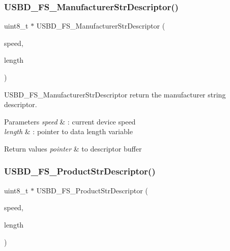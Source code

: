 \subsubsection{\texorpdfstring{U\+S\+B\+D\+\_\+\+F\+S\+\_\+\+Manufacturer\+Str\+Descriptor()}{USBD\_FS\_ManufacturerStrDescriptor()}}
{\footnotesize\ttfamily uint8\+\_\+t $\ast$ U\+S\+B\+D\+\_\+\+F\+S\+\_\+\+Manufacturer\+Str\+Descriptor (\begin{DoxyParamCaption}\item[{U\+S\+B\+D\+\_\+\+Speed\+Type\+Def}]{speed,  }\item[{uint16\+\_\+t $\ast$}]{length }\end{DoxyParamCaption})}



U\+S\+B\+D\+\_\+\+F\+S\+\_\+\+Manufacturer\+Str\+Descriptor return the manufacturer string descriptor. 


\begin{DoxyParams}{Parameters}
{\em speed} & \+: current device speed \\
\hline
{\em length} & \+: pointer to data length variable \\
\hline
\end{DoxyParams}

\begin{DoxyRetVals}{Return values}
{\em pointer} & to descriptor buffer \\
\hline
\end{DoxyRetVals}
\mbox{\label{group__USBD__DESC__Private__Functions_ga0ec558c0303daabb851d584109a56514}} 
\subsubsection{\texorpdfstring{U\+S\+B\+D\+\_\+\+F\+S\+\_\+\+Product\+Str\+Descriptor()}{USBD\_FS\_ProductStrDescriptor()}}
{\footnotesize\ttfamily uint8\+\_\+t $\ast$ U\+S\+B\+D\+\_\+\+F\+S\+\_\+\+Product\+Str\+Descriptor (\begin{DoxyParamCaption}\item[{U\+S\+B\+D\+\_\+\+Speed\+Type\+Def}]{speed,  }\item[{uint16\+\_\+t $\ast$}]{length }\end{DoxyParamCaption})}



